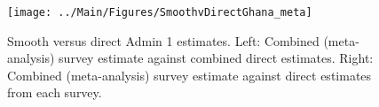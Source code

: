 \documentclass[12pt]{article}\usepackage[]{graphicx}\usepackage[]{color}
\newenvironment{knitrout}{}{} %
\begin{document}



\begin{knitrout}
\color{fgcolor}\begin{figure}[bht]

{\centering \texttt{[image: ../Main/Figures/SmoothvDirectGhana\_meta]} 

}

\caption[Smooth versus direct Admin 1 estimates]{Smooth versus direct Admin 1 estimates. Left: Combined (meta-analysis) survey estimate against combined direct estimates. Right: Combined (meta-analysis) survey estimate against direct estimates from each survey.}\label{fig:unnamed-chunk-143}
\end{figure}


\end{knitrout}
\end{document}
